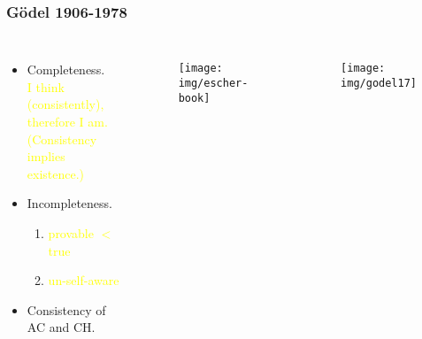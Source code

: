 \documentclass[UTF8,11pt,colorlinks,compress,openany]{beamer}%
\begin{document}
\begin{frame}\frametitle{G\"odel 1906-1978}
\centerline{}
	\begin{columns}
			\begin{itemize}
				\item Completeness.\\
				\textcolor{yellow}{\small I think (consistently), therefore I am.\\ (Consistency implies existence.)}
				\item Incompleteness.
				\begin{enumerate}
					\item \textcolor{yellow}{\small provable $<$ true}
					\item \textcolor{yellow}{\small un-self-aware}
				\end{enumerate}
				\item Consistency of AC and CH.
			\end{itemize}\vspace{-7pt}
			\begin{figure}
				\texttt{[image: img/escher-book]}
			\end{figure}
			\begin{figure}
				\texttt{[image: img/godel17]}
			\end{figure}
	\end{columns}
\end{frame}
\end{document}
